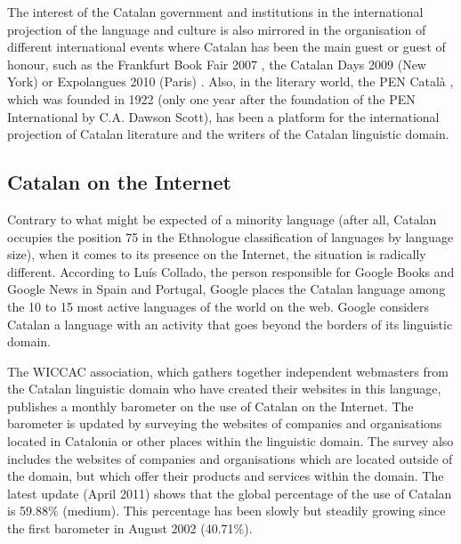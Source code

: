 \begin{multicols}{2}

The interest of the Catalan government and institutions in the international projection of the language and culture is also mirrored in the organisation of different international events where Catalan has been the main guest or guest of honour, such as the Frankfurt Book Fair 2007 \cite{CAT-Nota13}, the Catalan Days 2009 (New York) \cite{CAT-Nota14} or Expolangues 2010 (Paris) \cite{CAT-Nota15}. Also, in the literary world, the PEN Català \cite{CAT-Nota16}, which was founded in 1922 (only one year after the foundation of the PEN International by C.A. Dawson Scott), has been a platform for the international projection of Catalan literature and the writers of the Catalan linguistic domain.

\subsection{Catalan on the Internet}

Contrary to what might be expected of a minority language (after all, Catalan occupies the position 75 in the Ethnologue \cite{CAT-Nota17} classification of languages by language size), when it comes to its presence on the Internet, the situation is radically different. According to Luís Collado, the person responsible for Google Books and Google News in Spain and Portugal, Google places the Catalan language among the 10 to 15 most active languages of the world on the web. Google considers Catalan a language with an activity that goes beyond the borders of its linguistic domain.


The WICCAC \cite{CAT-Nota18} association, which gathers together independent webmasters from the Catalan linguistic domain who have created their websites in this language, publishes a monthly barometer on the use of Catalan on the Internet. The barometer is updated by surveying the websites of companies and organisations located in Catalonia or other places within the linguistic domain. The survey also includes the websites of companies and organisations which are located outside of the domain, but which offer their products and services within the domain. The latest update (April 2011) shows that the global percentage of the use of Catalan is 59.88\% (medium). This percentage has been slowly but steadily growing since the first barometer in August 2002 (40.71\%).


\end{multicols}
